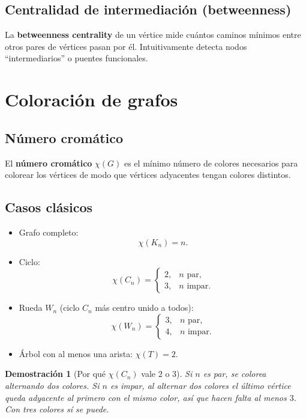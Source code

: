 \documentclass[11pt,a4paper]{article}
\newtheorem*{dem}{Demostración}
\begin{document}
\subsection{Centralidad de intermediación (betweenness)}
La \textbf{betweenness centrality} de un vértice mide cuántos caminos mínimos entre otros pares de vértices pasan por él. Intuitivamente detecta nodos ``intermediarios'' o puentes funcionales.

\section{Coloración de grafos}

\subsection{Número cromático}
El \textbf{número cromático} $\chi(G)$ es el mínimo número de colores necesarios para colorear los vértices de modo que vértices adyacentes tengan colores distintos.

\subsection{Casos clásicos}
\begin{itemize}
    \item Grafo completo:
    \[
    \chi(K_n)=n.
    \]
    \item Ciclo:
    \[
    \chi(C_n)=\begin{cases}
    2,& n \text{ par},\\
    3,& n \text{ impar}.
    \end{cases}
    \]
    \item Rueda $W_n$ (ciclo $C_n$ más centro unido a todos):
    \[
    \chi(W_n)=\begin{cases}
    3,& n \text{ par},\\
    4,& n \text{ impar}.
    \end{cases}
    \]
    \item Árbol con al menos una arista: $\chi(T)=2$.
\end{itemize}

\begin{dem}[Por qué $\chi(C_n)$ vale $2$ o $3$]
Si $n$ es par, se colorea alternando dos colores. Si $n$ es impar, al alternar dos colores el último vértice queda adyacente al primero con el mismo color, así que hacen falta al menos $3$. Con tres colores sí se puede.
\end{dem}
\end{document}
